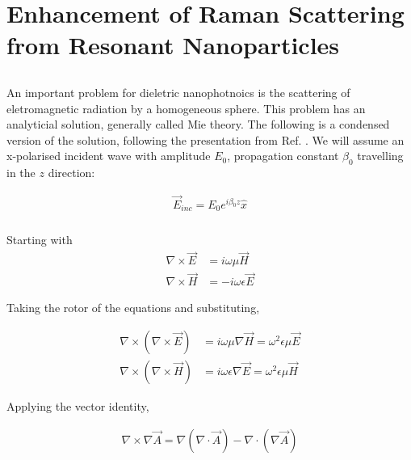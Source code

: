 \section{Enhancement of Raman Scattering from Resonant Nanoparticles}

    \subsection{}
            An important problem for dieletric nanophotnoics is the scattering of eletromagnetic radiation by
        a homogeneous sphere. This problem has an analyticial solution, generally called Mie theory\cite{mie1908beitrage}. The following
        is a condensed version of the solution, following the presentation from Ref. \cite{ng2000manipulation}.
        We will assume an x-polarised incident wave with amplitude $E_0$, propagation constant $\beta_0$ travelling in the $z$ direction:

        \begin{align}
            \vec{E}_{inc} = E_0 e^{i\beta_0z}\hat{x}
        \end{align}

        \subsubsection{}
            Starting with
            \begin{align}
                \nabla \times \vec{E} &= i\omega\mu\vec{H} \\
                \nabla \times \vec{H} &= -i\omega\epsilon\vec{E}
            \end{align}

            Taking the rotor of the equations and substituting,

            \begin{align}
                \nabla \times (\nabla \times \vec{E}) &= i\omega\mu \nabla \vec{H} = \omega^2 \epsilon\mu\vec{E} \\
                \nabla \times (\nabla \times \vec{H}) &= i\omega\epsilon \nabla \vec{E} = \omega^2 \epsilon\mu\vec{H}
            \end{align}

            Applying the vector identity,

            \begin{align}
                \nabla \times \nabla \vec{A} = \nabla (\nabla \cdot \vec{A}) - \nabla \cdot (\nabla\vec{A})
            \end{align}

